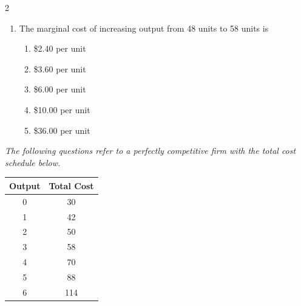 \documentclass[10pt]{article}
\newenvironment{choiceslist}
  {\begin{enumerate}[label=(\Alph*), leftmargin=1.6em, itemsep=0.12em, topsep=0.18em, parsep=0pt]}
  {\end{enumerate}}
\newenvironment{stimulus}
  {\begin{center}\begin{minipage}{0.96\columnwidth}\footnotesize\itshape\setlength{\tabcolsep}{3pt}\renewcommand{\arraystretch}{0.96}}
  {\end{minipage}\end{center}}
\begin{document}
\begin{multicols*}{2}
\begin{enumerate}[resume*=apq, leftmargin=*, itemsep=0.85em, topsep=0.2em, parsep=0pt]
\begin{choiceslist}
\item \$1.25
\item \$1.50
\item \$2.00
\end{choiceslist}
\item The marginal cost of increasing output from 48 units to 58 units is
\begin{choiceslist}
\item \$2.40 per unit
\item \$3.60 per unit
\item \$6.00 per unit
\item \$10.00 per unit
\item \$36.00 per unit
\end{choiceslist}
\end{enumerate}
\begin{stimulus}
The following questions refer to a perfectly competitive firm with the total cost schedule below.

\begin{center}
\begin{tabular}{cc}
\toprule
Output & Total Cost \\
\midrule
0 & 30 \\
1 & 42 \\
2 & 50 \\
3 & 58 \\
4 & 70 \\
5 & 88 \\
6 & 114 \\
\bottomrule
\end{tabular}
\end{center}


\end{stimulus}
\end{multicols*}
\end{document}
